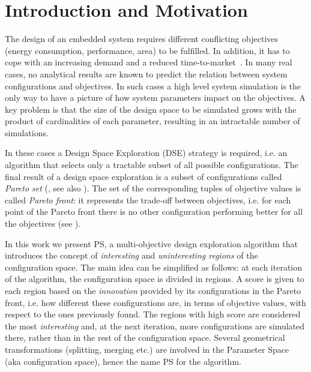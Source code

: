 
\section{Introduction and Motivation}

The design of an embedded system requires different conflicting
objectives (energy consumption, performance, area) to be fulfilled.
In addition, it has to cope with an increasing demand and a reduced time-to-market~\cite{wsts}.
In many real cases, no analytical results are known to predict the relation between
system configurations and objectives. In such cases a high level
system simulation is the only way to have a picture of how system
parameters impact on the objectives.  A key problem is that the size
of the design space to be simulated grows with the product of
cardinalities of each parameter, resulting in an intractable number
of simulations. 

In these cases a Design Space Exploration (DSE) strategy is required,
i.e. an algorithm that selects only a tractable subset of all possible
configurations.  The final result of a design space exploration is a
subset of configurations called \emph{Pareto set} (\cite{pareto},
see also ). The set of the corresponding tuples of objective values is called \emph{Pareto front}: it represents the trade-off between objectives,
i.e.  for each point of the Pareto front there is no other
configuration performing better for all the objectives (see
).


In this work we present PS, a multi-objective design exploration
algorithm that introduces the concept of \emph{interesting} and
\emph{uninteresting regions} of the configuration space.  The main
idea can be simplified as follows: at each iteration of the algorithm,
the configuration space is divided in regions. A score is given to
each region based on the \emph{innovation} provided by its
configurations in the Pareto front, i.e. how different these configurations are, in terms of objective values, with respect to the ones previously found. The regions with high score are considered the most \emph{interesting} and, at the next iteration, more configurations are simulated there, rather than in the rest of the configuration space.
Several geometrical transformations (splitting, merging etc.) are
involved in the Parameter Space (aka configuration space), hence
the name PS for the algorithm.

